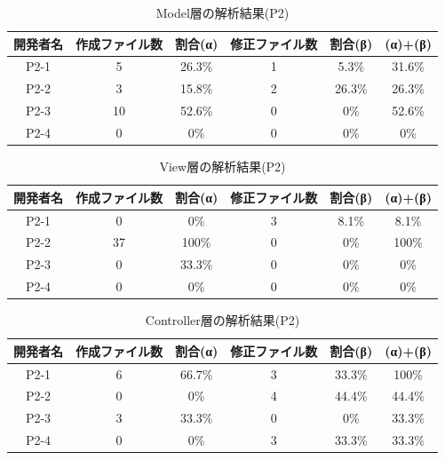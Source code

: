 \documentclass{funthesis}
\begin{document}
\begin{table}[H]
  \begin{center}
\begin{tabular}{|c|c|c|c|c||c|}\hline
開発者名&作成ファイル数&割合(α)&修正ファイル数&割合(β)&(α)+(β)\\ \hline
P2-1 & 5 & 26.3\% & 1 & 5.3\% & 31.6\%\\ \hline \hline
P2-2 & 3 & 15.8\% & 2 & 26.3\% & 26.3\%\\ \hline \hline
P2-3 & 10 & 52.6\% & 0 & 0\% & 52.6\%\\ \hline \hline
P2-4 & 0 & 0\% & 0 & 0\% & 0\%\\ \hline 
\end{tabular}    
\caption{Model層の解析結果(P2)}    \label{sample}
  \end{center}
\end{table}
\begin{table}[H]
  \begin{center}
\begin{tabular}{|c|c|c|c|c||c|}\hline
開発者名&作成ファイル数&割合(α)&修正ファイル数&割合(β)&(α)+(β)\\ \hline
P2-1 & 0 & 0\% & 3 & 8.1\% & 8.1\%\\ \hline \hline
P2-2 & 37 & 100\% & 0 & 0\% & 100\%\\ \hline \hline
P2-3 & 0 & 33.3\% & 0 & 0\% & 0\%\\ \hline \hline
P2-4 & 0 & 0\% & 0 & 0\% & 0\%\\ \hline 
\end{tabular}    
\caption{View層の解析結果(P2)}    \label{sample}
  \end{center}
\end{table}\begin{table}[H]
  \begin{center}
\begin{tabular}{|c|c|c|c|c||c|}\hline
開発者名&作成ファイル数&割合(α)&修正ファイル数&割合(β)&(α)+(β)\\ \hline
P2-1 & 6 & 66.7\% & 3 & 33.3\% & 100\%\\ \hline \hline
P2-2 & 0 & 0\% & 4 & 44.4\% & 44.4\%\\ \hline \hline
P2-3 & 3 & 33.3\% & 0 & 0\% & 33.3\%\\ \hline \hline
P2-4 & 0 & 0\% & 3 & 33.3\% & 33.3\%\\ \hline  
\end{tabular}    
\caption{Controller層の解析結果(P2)}    \label{sample}
  \end{center}
\end{table}
\end{document}
